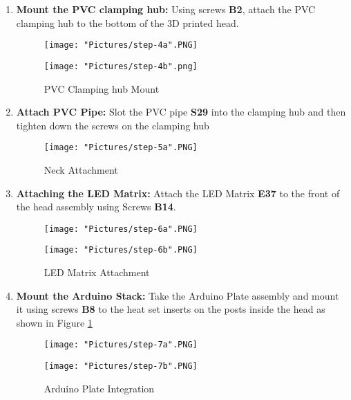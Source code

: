 \documentclass{article}
\begin{document}
\begin{enumerate}
\item \textbf{Mount the PVC clamping hub:} Using screws \textbf{B2}, attach the PVC clamping hub to the bottom of the 3D printed head. 

\begin{figure}[H]
	\centering
  	\begin{minipage}[b]{0.45\textwidth}
		\texttt{[image: "Pictures/step-4a".PNG]}
  	\end{minipage}
  	\hfill
  	\begin{minipage}[b]{0.45\textwidth}
    		\texttt{[image: "Pictures/step-4b".png]}
  	\end{minipage}
  	\caption{PVC Clamping hub Mount}
\end{figure}

\item \textbf{Attach PVC Pipe:} Slot the PVC pipe \textbf{S29} into the clamping hub and then tighten down the screws on the clamping hub

\begin{figure}[H]
\centering
  \texttt{[image: "Pictures/step-5a".PNG]}
	\caption{Neck Attachment}
\end{figure}

\item \textbf{Attaching the LED Matrix:} Attach the LED Matrix \textbf{E37} to the front of the head assembly using Screws \textbf{B14}. 

\begin{figure}[H]
	\centering
  	\begin{minipage}[b]{0.45\textwidth}
		\texttt{[image: "Pictures/step-6a".PNG]}
  	\end{minipage}
  	\hfill
  	\begin{minipage}[b]{0.45\textwidth}
    		\texttt{[image: "Pictures/step-6b".PNG]}
  	\end{minipage}
  	\caption{LED Matrix Attachment}
\end{figure}

\item \textbf{Mount the Arduino Stack:} Take the Arduino Plate assembly and mount it using screws \textbf{B8} to the heat set inserts on the posts inside the head as shown in Figure \ref{arduino_plate_integration}

\begin{figure}[H]
	\centering
  	\begin{minipage}[b]{0.45\textwidth}
		\texttt{[image: "Pictures/step-7a".PNG]}
  	\end{minipage}
  	\hfill
  	\begin{minipage}[b]{0.45\textwidth}
    		\texttt{[image: "Pictures/step-7b".PNG]}
  	\end{minipage}
	\caption{Arduino Plate Integration}
	\label{arduino_plate_integration}
\end{figure}


\end{enumerate}
\end{document}
